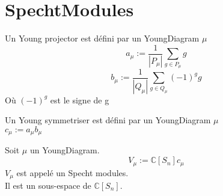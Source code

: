\chapter{SpechtModules}

\begin{definition}[YoungProjectors]
    \label{YoungProjectors}
    Un Young projector est défini par un YoungDiagram $\mu$\\
    \[ a_{\mu} := \frac{1}{|P_{\mu}|}\sum_{g \in P_{\mu}}g \]
    \[ b_{\mu} := \frac{1}{|Q_{\mu}|}\sum_{g \in Q_{\mu}}(-1)^{g}g \]
    Où $(-1)^{g}$ est le signe de g
\end{definition}

\begin{definition}[YoungSymmetriser]
    \label{YoungSymmetriser}
    Un Young symmetriser est défini par un YoungDiagram $\mu$\\
    $c_{\mu} := a_{\mu} b_{\mu} $
\end{definition}

\begin{definition}[SpechtModules]
    \label{SpechtModules}
    Soit $\mu$ un YoungDiagram.
    \[ V_{\mu} := \mathbb{C}[S_{n}]c_{\mu} \]
    $V_{\mu}$ est appelé un Specht modules.\\
    Il est un sous-espace de $\mathbb{C}[S_{n}]$.
\end{definition}

